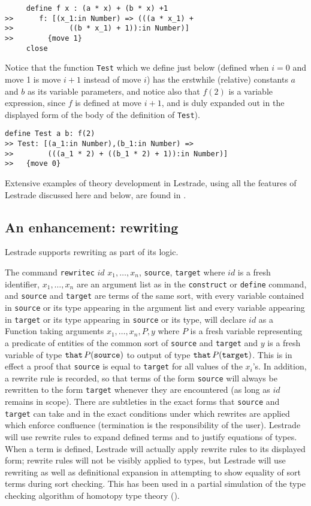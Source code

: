 \documentclass[submission,copyright,creativecommons]{eptcs}
\begin{document}
\begin{verbatim}
     define f x : (a * x) + (b * x) +1
>>      f: [(x_1:in Number) => (((a * x_1) + 
>>             ((b * x_1) + 1)):in Number)]
>>        {move 1}
     close
\end{verbatim}

 Notice that the function {\tt Test} which we define just below (defined when $i=0$ and move 1 is move $i+1$ instead of move $i$) has the erstwhile (relative) constants $a$ and $b$ as its variable parameters, and notice also that $f(2)$ is a variable expression, since $f$ is defined at move $i+1$, and is duly expanded out in the displayed form of the body of the definition of {\tt Test}).

\begin{verbatim}
define Test a b: f(2)
>> Test: [(a_1:in Number),(b_1:in Number) => 
>>        (((a_1 * 2) + ((b_1 * 2) + 1)):in Number)]
>>   {move 0}
\end{verbatim}

Extensive examples of theory development in Lestrade, using all the features of Lestrade discussed here and below, are found in \cite{lestrademanual}.

\subsection{An enhancement: rewriting}

Lestrade supports rewriting as part of its logic.

The command {\tt rewritec} $id$ $x_1, \ldots, x_n$, {\tt source}, {\tt target}  where $id$ is a fresh identifier, $x_1, \ldots, x_n$ are an argument list as in the {\tt construct} or {\tt define} command, and {\tt source} and {\tt target} are terms of the same sort, with every variable contained in {\tt source} or its type appearing in the argument list and every variable appearing in {\tt target} or its type appearing in {\tt source} or its type, will declare $id$ as a Function taking arguments $x_1,\ldots,x_n,P,y$ where $P$ is a fresh variable representing a predicate of entities of the common sort of {\tt source} and {\tt target} and $y$ is a fresh variable of type
${\tt that} \,P({\tt source})$ to output of type ${\tt that}\, P({\tt target})$.  This is in effect a proof that {\tt source} is equal to {\tt target} for all values of the $x_i$'s.  In addition, a rewrite rule is recorded, so that terms of the form {\tt source} will always be rewritten to the form {\tt target} whenever they are encountered (as long as $id$ remains in scope).  There are subtleties in the exact forms that {\tt source} and {\tt target} can take and in the exact conditions under which rewrites are applied which enforce confluence (termination is the responsibility of the user).  Lestrade will use rewrite rules to expand defined terms and to justify equations of types.   When a term is defined, Lestrade will actually apply rewrite rules to its displayed form;  rewrite rules will not be visibly applied to types, but Lestrade will use rewriting as well as definitional expansion in attempting to show equality of sort terms during sort checking.   This has been used in a partial simulation of the type checking algorithm of homotopy type theory (\cite{hott}). 
\end{document}
